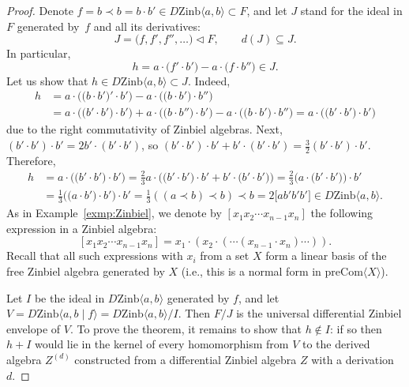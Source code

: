 \documentclass[11pt]{article}
\numberwithin{equation}{section}
\numberwithin{equation}{section}
\def\Com{\mathrm{Com}}
\def\Zinb{\mathrm{Zinb}}
\def\pre{\mathrm{pre}}
\begin{document}
\begin{proof}
Denote $f=b\prec b=b\cdot b' \in D\Zinb \langle a,b\rangle \subset F$, and let $J$ stand for the ideal in $F$ generated by~$f$ and all its derivatives:
\[
J = \bigl(f,f',f'', \dots \bigr) \triangleleft F,\qquad d(J)\subseteq J.
\]
In particular,
\[
h = a\cdot \bigl(f'\cdot b'\bigr)-a\cdot \bigl(f\cdot b''\bigr) \in J.
\]
Let us show that $h\in D\Zinb \langle a,b\rangle \subset J$.
Indeed,
\begin{align*}
h &= a\cdot \bigl(\bigl(b\cdot b'\bigr)'\cdot b'\bigr)-a\cdot \bigl(\bigl(b\cdot b'\bigr)\cdot b''\bigr) \\
 &= a\cdot \bigl(\bigl(b'\cdot b'\bigr)\cdot b'\bigr) + a\cdot \bigl(\bigl(b\cdot b''\bigr)\cdot b'\bigr)-a\cdot \bigl(\bigl(b\cdot b'\bigr)\cdot b''\bigr)
 = a\cdot \bigl(\bigl(b'\cdot b'\bigr)\cdot b'\bigr)
\end{align*}
due to the right commutativity of Zinbiel algebras.
Next,
$(b'\cdot b')\cdot b' = 2b'\cdot (b'\cdot b')$,
so
$(b'\cdot b')\cdot b'+b'\cdot (b'\cdot b')
= \frac{3}{2} (b'\cdot b')\cdot b'$.
Therefore,
\begin{align*}
h &= a\cdot \bigl(\bigl(b'\cdot b'\bigr)\cdot b'\bigr)
= \frac{2}{3} a\cdot \bigl(\bigl(b'\cdot b'\bigr)\cdot b' + b'\cdot \bigl(b'\cdot b'\bigr)\bigr)
 = \frac{2}{3} \bigl(a\cdot \bigl(b'\cdot b'\bigr)\bigr)\cdot b'
 \\
 &= \frac{1}{3} \bigl(\bigl(a\cdot b'\bigr)\cdot b'\bigr)\cdot b'= \frac{1}{3} ((a\prec b)\prec b)\prec b = 2\bigl[ab'b'b'\bigr]
 \in D\Zinb \langle a,b\rangle .
\end{align*}
As in Example~\ref{exmp:Zinbiel}, we denote by
$[x_1x_2\cdots x_{n-1}x_n]$ the following expression
in a Zinbiel algebra:
\[
[x_1x_2\cdots x_{n-1}x_n]
= x_1\cdot (x_2\cdot (\cdots (x_{n-1}\cdot x_n)\cdots )).
\]
Recall \cite{Loday} that all such expressions with $x_i$
from a set $X$ form a linear basis of the free Zinbiel algebra
generated by $X$ (i.e., this is a normal form in $\pre\Com\langle X\rangle $).

Let $I$ be the ideal in $D\Zinb \langle a,b\rangle $
generated by $f$, and let $V = D\Zinb \langle a,b\mid f\rangle
=D\Zinb \langle a,b\rangle/I $.
Then
$F/J$ is the universal differential Zinbiel envelope
of $V$. To prove the theorem, it remains to show that $h\notin I$:
if so then $h+I$
would lie in the kernel of every homomorphism
from $V$ to the derived algebra $Z^{(d)}$
constructed
from a differential Zinbiel algebra $Z$ with a derivation~$d$.


\end{proof}
\end{document}
